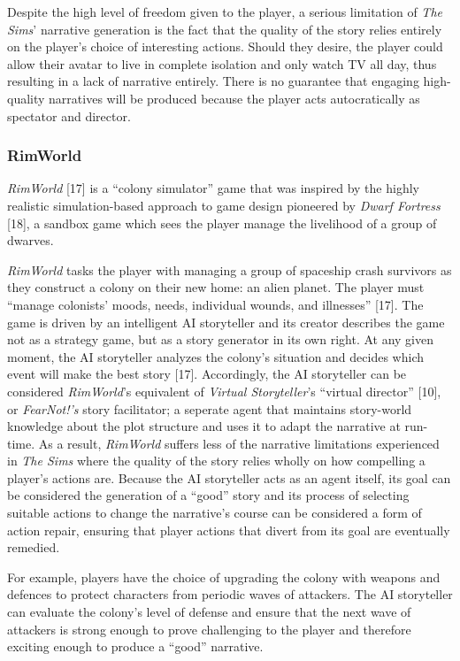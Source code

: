 \documentclass{sig-alternate-05-2015}
\begin{document}
Despite the high level of freedom given to the player, a serious limitation of \textit{The Sims}' narrative generation is the fact that the quality of the story relies entirely on the player's choice of interesting actions. Should they desire, the player could allow their avatar to live in complete isolation and only watch TV all day, thus resulting in a lack of narrative entirely. There is no guarantee that engaging high-quality narratives will be produced because the player acts autocratically as spectator and director.

\subsubsection{RimWorld}
\textit{RimWorld} [17] is a ``colony simulator'' game that was inspired by the highly realistic simulation-based approach to game design pioneered by \textit{Dwarf Fortress} [18], a sandbox game which sees the player manage the livelihood of a group of dwarves.

\textit{RimWorld} tasks the player with managing a group of spaceship crash survivors as they construct a colony on their new home: an alien planet. The player must ``manage colonists' moods, needs, individual wounds, and illnesses'' [17]. The game is driven by an intelligent AI storyteller and its creator describes the game not as a strategy game, but as a story generator in its own right. At any given moment, the AI storyteller analyzes the colony's situation and decides which event will make the best story [17]. Accordingly, the AI storyteller can be considered \textit{RimWorld}'s equivalent of \textit{Virtual Storyteller}'s ``virtual director'' [10], or \textit{FearNot!'s} story facilitator;  a seperate agent that maintains story-world knowledge about the plot structure and uses it to adapt the narrative at run-time. As a result, \textit{RimWorld} suffers less of the narrative limitations experienced in \textit{The Sims} where the quality of the story relies wholly on how compelling a player's actions are. Because the AI storyteller acts as an agent itself, its goal can be considered the generation of a ``good'' story and its process of selecting suitable actions to change the narrative's course can be considered a form of action repair, ensuring that player actions that divert from its goal are eventually remedied. 

For example, players have the choice of upgrading the colony with weapons and defences to protect characters from periodic waves of attackers. The AI storyteller can evaluate the colony's level of defense and ensure that the next wave of attackers is strong enough to prove challenging to the player and therefore exciting enough to produce a ``good'' narrative.
\end{document}
